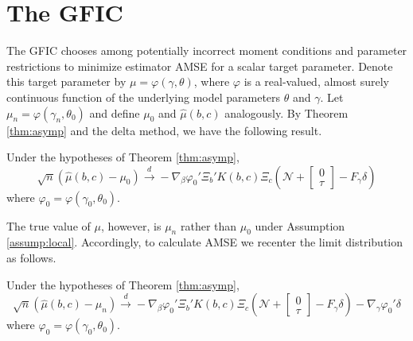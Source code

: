\section{The GFIC}
\label{sec:GFIC}
The GFIC chooses among potentially incorrect moment conditions and parameter restrictions to minimize estimator AMSE for a scalar target parameter. 
Denote this target parameter by $\mu = \varphi(\gamma, \theta)$, where  $\varphi$ is a real-valued, almost surely continuous function of the underlying model parameters $\theta$ and $\gamma$.
Let $\mu_n = \varphi(\gamma_n,\theta_0)$ and define $\mu_0$ and $\widehat{\mu}(b,c)$  analogously.
By Theorem \ref{thm:asymp} and the delta method, we have the following result.
\begin{cor} Under the hypotheses of Theorem \ref{thm:asymp},
		$$\sqrt{n}\left(\widehat{\mu}(b,c) - \mu_0 \right) \overset{d}{\rightarrow} -\nabla_\beta\varphi_0'\Xi_b '  K(b,c)\Xi_c \left(\mathscr{N}+ \left[ \begin{array}{c} 0\\ \tau\end{array}\right] - F_\gamma\delta\right) $$
where $\varphi_0 = \varphi(\gamma_0,\theta_0)$.
\end{cor}
The true value of $\mu$, however,  is $\mu_n$ rather than $\mu_0$ under Assumption \ref{assump:local}.
Accordingly, to calculate AMSE we recenter the limit distribution as follows.
\begin{cor} 
\label{cor:mulimit}
Under the hypotheses of Theorem \ref{thm:asymp},
		$$\sqrt{n}\left(\widehat{\mu}(b,c) - \mu_n \right) \overset{d}{\rightarrow} -\nabla_\beta\varphi_0'\Xi_b '  K(b,c)\Xi_c \left(\mathscr{N}+ \left[ \begin{array}{c} 0\\ \tau\end{array}\right] - F_\gamma\delta\right) -\nabla_\gamma \varphi_0' \delta$$
where $\varphi_0 = \varphi(\gamma_0,\theta_0)$.
\end{cor}

